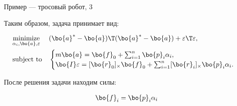 \begin{frame}{Пример — тросовый робот, 3}
	\begin{flushleft}
		
		Таким образом, задача принимает вид:
		
		\begin{equation}
			\begin{aligned}
				& \underset{\alpha_i, \bo{a}, \varepsilon}{\text{minimize}}
				& & (\bo{a}^* - \bo{a})\T (\bo{a}^* - \bo{a}) + \varepsilon\T \varepsilon, 
				\\
				& \text{subject to}
				& & \begin{cases}
					m \bo{a} = \bo{f}_0 + \sum_{i = 1}^{n} \bo{p}_i \alpha_i,
					\\
					\bo{I} \varepsilon = [\bo{r}_0]_\times \bo{f}_0 + \sum_{i = 1}^{n} [\bo{r}_i]_\times \bo{p}_i \alpha_i.
				\end{cases}
			\end{aligned}
		\end{equation}
		
		\bigskip
		
		После решения задачи находим силы:
		
		\begin{align}
			\bo{f}_i  = \bo{p}_i \alpha_i
		\end{align}
		
	\end{flushleft}
\end{frame}